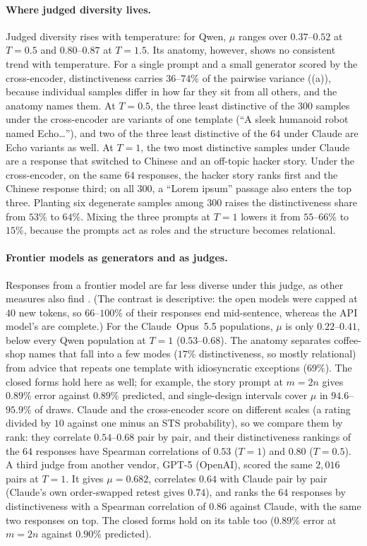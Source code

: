 \paragraph{Where judged diversity lives.} Judged diversity rises with
temperature: for Qwen, $\mu$ ranges over $0.37$--$0.52$ at $T=0.5$ and
$0.80$--$0.87$ at $T=1.5$. Its anatomy, however, shows no consistent trend
with temperature. For a single prompt and a small generator scored by the cross-encoder,
distinctiveness carries $36$--$74\%$
of the pairwise variance ((a)), because individual samples
differ in how far they sit from all others, and the anatomy names them. At
$T=0.5$, the three least distinctive of the $300$ samples under the
cross-encoder are variants of one template (``A sleek humanoid robot named
Echo\ldots''), and two of the three least distinctive of the $64$ under
Claude are Echo variants as well. At $T=1$, the two most distinctive samples under Claude are a
response that switched to Chinese and an off-topic hacker story. Under the
cross-encoder, on the same $64$ responses, the hacker story ranks first and
the Chinese response third; on all $300$, a ``Lorem ipsum'' passage also
enters the top three. Planting six degenerate samples among $300$ raises the
distinctiveness share from $53\%$ to $64\%$. Mixing the three prompts at
$T=1$ lowers it from $55$--$66\%$ to $15\%$, because the prompts act as
roles and the structure becomes relational.

\paragraph{Frontier models as generators and as judges.} Responses from a
frontier model are far less diverse under this judge, as other measures
also find \citep{zhang2025noveltybench,jiang2025hivemind}. (The contrast is
descriptive: the open models were capped at $40$ new tokens, so $66$--$100\%$ of
their responses end mid-sentence, whereas the API model's are complete.) For the Claude~Opus~5.5 populations, $\mu$ is
only $0.22$--$0.41$, below every Qwen population at $T=1$
($0.53$--$0.68$). The anatomy separates coffee-shop names that fall into a
few modes ($17\%$ distinctiveness, so mostly relational) from advice that
repeats one template with idiosyncratic exceptions ($69\%$). The closed
forms hold here as well; for example, the story prompt at $m=2n$ gives
$0.89\%$ error against $0.89\%$ predicted, and single-design intervals cover
$\mu$ in $94.6$--$95.9\%$ of draws. Claude and the cross-encoder score on different scales (a rating divided
by $10$ against one minus an STS probability), so we compare them by rank:
they correlate $0.54$--$0.68$ pair by pair, and their distinctiveness
rankings of the $64$ responses have Spearman correlations of $0.53$ ($T=1$)
and $0.80$ ($T=0.5$). A third judge from another vendor, GPT-5 (OpenAI),
scored the same $2{,}016$ pairs at $T=1$. It gives $\mu=0.682$, correlates
$0.64$ with Claude pair by pair (Claude's own order-swapped retest gives
$0.74$), and ranks the $64$ responses by distinctiveness with a Spearman
correlation of $0.86$ against Claude, with the same two responses on top.
The closed forms hold on its table too ($0.89\%$ error at $m=2n$ against
$0.90\%$ predicted).

